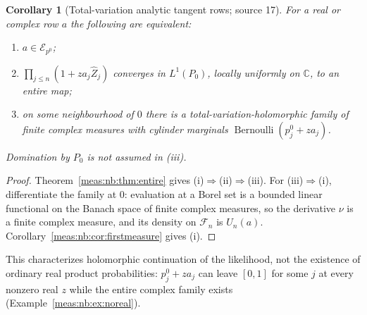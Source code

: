 \documentclass[11pt]{article}
\numberwithin{equation}{section}
\newtheorem{corollary}[theorem]{Corollary}
\theoremstyle{definition}
\theoremstyle{remark}
\newcommand{\C}{\mathbb C}
\newcommand{\Zh}{\widehat Z}
\newcommand{\Erow}{\mathcal E_{p^0}}
\begin{document}
\begin{corollary}[Total-variation analytic tangent rows; source 17]
\label{meas:nb:cor:analytic}
For a real or complex row $a$ the following are equivalent:
\begin{enumerate}[label=(\roman*)]
\item $a\in\Erow$;
\item $\prod_{j\le n}(1+za_j\Zh_j)$ converges in $L^1(P_0)$, locally uniformly on
$\C$, to an entire map;
\item on some neighbourhood of $0$ there is a total-variation-holomorphic family of
finite complex measures with cylinder marginals
$\operatorname{Bernoulli}(p_j^0+za_j)$.
\end{enumerate}
Domination by $P_0$ is not assumed in (iii).
\end{corollary}
\begin{proof}
Theorem~\ref{meas:nb:thm:entire} gives (i)$\Rightarrow$(ii)$\Rightarrow$(iii). For
(iii)$\Rightarrow$(i), differentiate the family at $0$: evaluation at a Borel set is a
bounded linear functional on the Banach space of finite complex measures, so the
derivative $\nu$ is a finite complex measure, and its density on $\mathcal F_n$ is
$U_n(a)$. Corollary~\ref{meas:nb:cor:firstmeasure} gives (i).
\end{proof}

This characterizes holomorphic continuation of the likelihood, not the existence
of ordinary real product probabilities: $p_j^0+za_j$ can leave $[0,1]$ for some $j$
at every nonzero real $z$ while the entire complex family exists
(Example~\ref{meas:nb:ex:noreal}).
\end{document}
